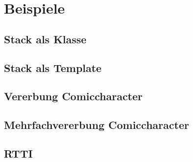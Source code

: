 \section{Beispiele}
	\subsection{Stack als Klasse}
		
	
\newpage	
	\subsection{Stack als Template}
		
		
\newpage
 	\subsection{Vererbung Comiccharacter}
 		
 		
 		
 		
 		
 		
\newpage
	\subsection{Mehrfachvererbung Comiccharacter}
	 	
	 	
		
 		
 		
 		
 		
 		
 		
 		
 		
 		
\newpage
	\subsection{RTTI}
	 	
	
